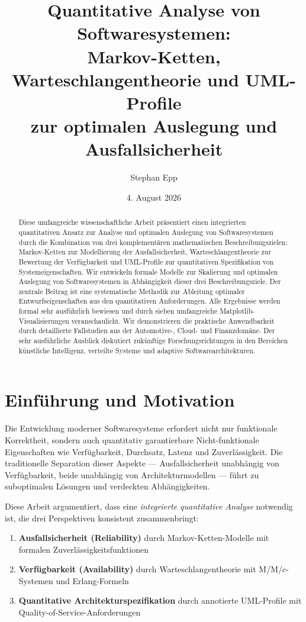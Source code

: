 \documentclass[a4paper,11pt]{article}
\title{Quantitative Analyse von Softwaresystemen:\\
Markov-Ketten, Warteschlangentheorie und UML-Profile\\
zur optimalen Auslegung und Ausfallsicherheit}
\author{Stephan Epp}
\date{4. August 2026}
\theoremstyle{definition}
\begin{document}
\maketitle

\begin{abstract}
Diese umfangreiche wissenschaftliche Arbeit präsentiert einen integrierten quantitativen Ansatz 
zur Analyse und optimalen Auslegung von Softwaresystemen durch die Kombination von drei komplementären 
mathematischen Beschreibungszielen: Markov-Ketten zur Modellierung der Ausfallsicherheit, 
Warteschlangentheorie zur Bewertung der Verfügbarkeit und UML-Profile zur quantitativen Spezifikation 
von Systemeigenschaften. Wir entwickeln formale Modelle zur Skalierung und optimalen Auslegung von 
Softwaresystemen in Abhängigkeit dieser drei Beschreibungsziele. Der zentrale Beitrag ist eine 
systematische Methodik zur Ableitung optimaler Entwurfseigenschaften aus den quantitativen 
Anforderungen. Alle Ergebnisse werden formal sehr ausführlich bewiesen und durch sieben umfangreiche 
Matplotlib-Visualisierungen veranschaulicht. Wir demonstrieren die praktische Anwendbarkeit durch 
detaillierte Fallstudien aus der Automotive-, Cloud- und Finanzdomäne. Der sehr ausführliche Ausblick 
diskutiert zukünftige Forschungsrichtungen in den Bereichen künstliche Intelligenz, verteilte Systeme 
und adaptive Softwarearchitekturen.
\end{abstract}

\tableofcontents
\newpage

\section{Einführung und Motivation}

Die Entwicklung moderner Softwaresysteme erfordert nicht nur funktionale Korrektheit, sondern auch 
quantitativ garantierbare Nicht-funktionale Eigenschaften wie Verfügbarkeit, Durchsatz, Latenz und 
Zuverlässigkeit. Die traditionelle Separation dieser Aspekte --- Ausfallsicherheit unabhängig von 
Verfügbarkeit, beide unabhängig von Architekturmodellen --- führt zu suboptimalen Lösungen und 
verdeckten Abhängigkeiten.

Diese Arbeit argumentiert, dass eine \emph{integrierte quantitative Analyse} notwendig ist, die 
drei Perspektiven konsistent zusammenbringt:

\begin{enumerate}
    \item \textbf{Ausfallsicherheit (Reliability)} durch Markov-Ketten-Modelle mit formalen 
          Zuverlässigkeitsfunktionen
    \item \textbf{Verfügbarkeit (Availability)} durch Warteschlangentheorie mit M/M/c-Systemen 
          und Erlang-Formeln
    \item \textbf{Quantitative Architekturspezifikation} durch annotierte UML-Profile mit 
          Quality-of-Service-Anforderungen
\end{enumerate}
\end{document}
